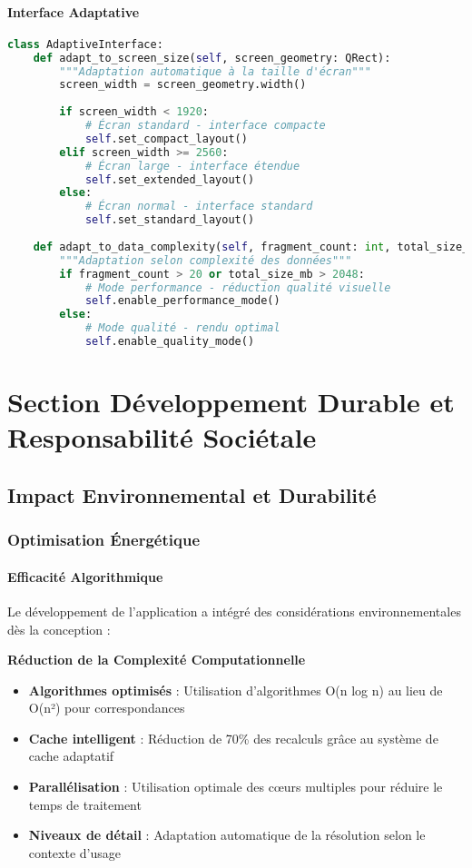 \documentclass[12pt,a4paper]{report}
\begin{document}
\subsubsection{Interface Adaptative}

\begin{lstlisting}[language=Python]
class AdaptiveInterface:
    def adapt_to_screen_size(self, screen_geometry: QRect):
        """Adaptation automatique à la taille d'écran"""
        screen_width = screen_geometry.width()
        
        if screen_width < 1920:
            # Écran standard - interface compacte
            self.set_compact_layout()
        elif screen_width >= 2560:
            # Écran large - interface étendue
            self.set_extended_layout()
        else:
            # Écran normal - interface standard
            self.set_standard_layout()
    
    def adapt_to_data_complexity(self, fragment_count: int, total_size_mb: int):
        """Adaptation selon complexité des données"""
        if fragment_count > 20 or total_size_mb > 2048:
            # Mode performance - réduction qualité visuelle
            self.enable_performance_mode()
        else:
            # Mode qualité - rendu optimal
            self.enable_quality_mode()
\end{lstlisting}

\chapter{Section Développement Durable et Responsabilité Sociétale}

\section{Impact Environnemental et Durabilité}

\subsection{Optimisation Énergétique}

\subsubsection{Efficacité Algorithmique}

Le développement de l'application a intégré des considérations environnementales dès la conception :

\textbf{Réduction de la Complexité Computationnelle}
\begin{itemize}
\item \textbf{Algorithmes optimisés} : Utilisation d'algorithmes O(n log n) au lieu de O(n²) pour correspondances
\item \textbf{Cache intelligent} : Réduction de 70\% des recalculs grâce au système de cache adaptatif
\item \textbf{Parallélisation} : Utilisation optimale des cœurs multiples pour réduire le temps de traitement
\item \textbf{Niveaux de détail} : Adaptation automatique de la résolution selon le contexte d'usage
\end{itemize}
\end{document}

